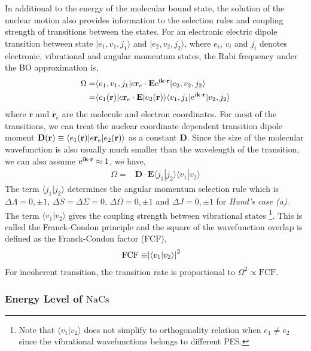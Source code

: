 In additional to the energy of the molecular bound state,
the solution of the nuclear motion also provides information to the selection rules
and coupling strength of transitions between the states.
For an electronic electric dipole transition between state
$|e_1,v_1,j_1\rangle$ and $|e_2,v_2,j_2\rangle$,
where $e_i$, $v_i$ and $j_i$ denotes electronic, vibrational and angular momentum states,
the Rabi frequency under the BO approximation is,
\begin{align*}
  \Omega=&\langle e_1,v_1,j_1|e\mathbf{r}_e\cdot\mathbf{E}\mathrm{e}^{\mathrm{i}\mathbf{k}\cdot\mathbf{r}}|e_2,v_2,j_2\rangle\\
  =&\langle e_1(\mathbf{r})|e\mathbf{r}_e\cdot\mathbf{E}|e_2(\mathbf{r})\rangle\langle v_1,j_1|\mathrm{e}^{\mathrm{i}\mathbf{k}\cdot\mathbf{r}}|v_2,j_2\rangle
\end{align*}
where $\mathbf{r}$ and $\mathbf{r}_e$ are the molecule and electron coordinates.
For most of the transitions, we can treat the nuclear coordinate dependent transition dipole
moment $\mathbf{D}{\left({\mathbf{r}}\right)}\equiv\langle e_1(\mathbf{r})|e\mathbf{r}_e|e_2(\mathbf{r})\rangle$ as a constant $\mathbf{D}$.
Since the size of the molecular wavefunction is also usually much smaller than
the wavelength of the transition, we can also assume $\mathrm{e}^{\mathrm{i}\mathbf{k}\cdot\mathbf{r}}\approx 1$,
we have,
\begin{align*}
  \Omega=&\mathbf{D}\cdot\mathbf{E}\langle j_1|j_2\rangle\langle v_1|v_2\rangle
\end{align*}
The term $\langle j_1|j_2\rangle$ determines the angular momentum selection rule which is
$\Delta\Lambda=0,\pm1$, $\Delta S=\Delta\Sigma=0$, $\Delta\Omega=0,\pm1$ and $\Delta J=0,\pm1$
for \textit{Hund's case (a)}\cite[p.~14-15]{straughan_spectroscopy_1976}.
The term $\langle v_1|v_2\rangle$ gives the coupling strength between vibrational states
\footnote{Note that $\langle v_1|v_2\rangle$ does not simplify to orthogonality relation
  when $e_1\neq e_2$ since the vibrational wavefunctions belongs to different PES.}.
This is called the Franck-Condon principle and the square of the wavefunction overlap
is defined as the Franck-Condon factor (FCF),
\begin{align*}
  \mathrm{FCF}\equiv&{\left|{\langle v_1|v_2\rangle}\right|}^2
\end{align*}
For incoherent transition, the transition rate is proportional to $\Omega^2\propto\mathrm{FCF}$.

\subsubsection{Energy Level of $\mathrm{NaCs}$}

